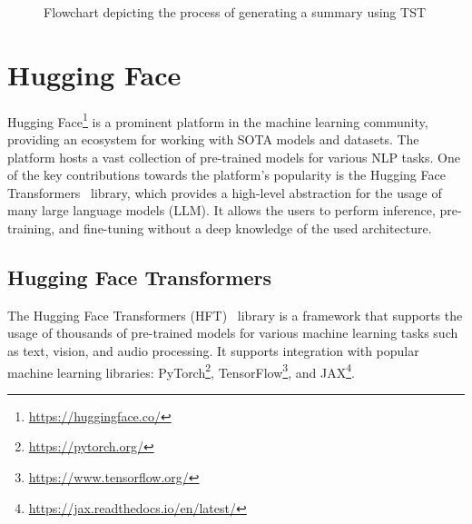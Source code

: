 \documentclass[english, ba, kiv, he, iso690numb, pdf, viewonly]{fasthesis}
\begin{document}
\begin{figure}[ht]
\centering
\caption{Flowchart depicting the process of generating a summary using TST}
\setlength{\fboxsep}{10pt}
\label{fig:design2}
\end{figure}

\section{Hugging Face} \label{hf}
Hugging Face\footnote{\url{https://huggingface.co/}} is a prominent platform in the machine learning community, providing an ecosystem for working with SOTA models and datasets. The platform hosts a vast collection of pre-trained models for various NLP tasks. One of the key contributions towards the platform's popularity is the Hugging Face Transformers~\cite{wolf-etal-2020-transformers} library, which provides a high-level abstraction for the usage of many large language models (LLM). It allows the users to perform inference, pre-training, and fine-tuning without a deep knowledge of the used architecture. 
\subsection{Hugging Face Transformers}
The Hugging Face Transformers (HFT)~\cite{wolf-etal-2020-transformers} library is a framework that supports the usage of thousands of pre-trained models for various machine learning tasks such as text, vision, and audio processing. It supports integration with popular machine learning libraries: PyTorch\footnote{\url{https://pytorch.org/}}, TensorFlow\footnote{\url{https://www.tensorflow.org/}}, and JAX\footnote{\url{https://jax.readthedocs.io/en/latest/}}.
\end{document}
